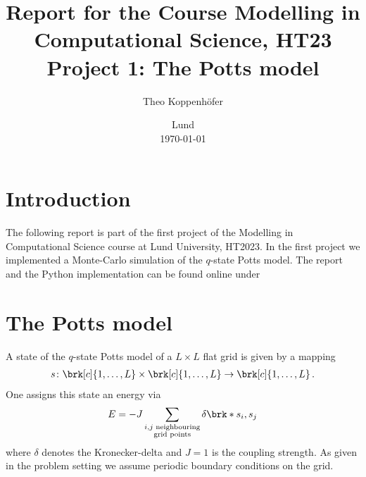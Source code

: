 




\title{ Report for the Course Modelling in Computational Science, HT23 \\[1ex]
	  \large Project 1: The Potts model}
\author{Theo Koppenhöfer}
\date{Lund \\[1ex] \today}



\usepackage{pythonhighlight}
\usepackage{pgfplots}
\graphicspath{{../Figures/}}






\maketitle

\section{Introduction}

The following report is part of the first project of the Modelling in Computational Science course at Lund University, HT2023.
In the first project we implemented a Monte-Carlo simulation of the $q$-state Potts model.
The report and the Python implementation can be found online under \cite{Repository}

\section{The Potts model}

A state of the $q$-state Potts model of a $L\times L$ flat grid is given by a mapping
\begin{align*}
	s\colon \brk[c]{1,\dots,L}\times\brk[c]{1,\dots,L}\to\brk[c]{1,\dots,L}\,.
\end{align*}
One assigns this state an energy via
\begin{align*}
	E = -J\sum_{\substack{i, j\text{ neighbouring}\\ \text{grid points}}}\delta\brk*{s_i,s_j}
\end{align*}
where $\delta$ denotes the Kronecker-delta and $J=1$ is the coupling strength. As given in the problem setting we assume periodic boundary conditions on the grid.

